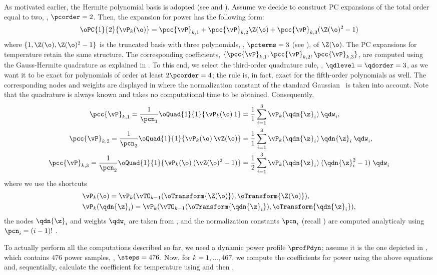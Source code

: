  As motivated earlier, the Hermite polynomial basis is adopted (see  and ). Assume we decide to construct PC expansions of the total order equal to two, \ie, $\pcorder = 2$. Then, the expansion for power has the following form:
\[
  \oPC{1}{2}{\vP_k(\o)} = \pcc{\vP}_{k, 1} + \pcc{\vP}_{k, 2} \Z(\o) + \pcc{\vP}_{k, 3} (\Z(\o)^2 - 1)
\]
where $\{ 1, \Z(\o), \Z(\o)^2 - 1 \}$ is the truncated basis with three polynomials, \ie, $\pcterms = 3$ (see ), of $\Z(\o)$. The PC expansions for temperature retain the same structure. The corresponding coefficients, $\{ \pcc{\vP}_{k, 1}, \pcc{\vP}_{k, 2}, \pcc{\vP}_{k, 3} \}$, are computed using the Gauss-Hermite quadrature as explained in . To this end, we select the third-order quadrature rule, \ie, $\qdlevel = \qdorder = 3$, as we want it to be exact for polynomials of order at least $2 \pcorder = 4$; the rule is, in fact, exact for the fifth-order polynomials as well. The corresponding nodes and weights are displayed in  where the normalization constant of the standard Gaussian \pdf\ is taken into account. Note that the quadrature is always known and takes no computational time to be obtained. Consequently,
\begin{align*}
  \pcc{\vP}_{k, 1} = \frac{1}{\pcn_1} \oQuad{1}{1}{\vP_k(\o) \: 1} & = \frac{1}{1} \sum_{i = 1}^3 \vP_k(\qdn{\z}_i) \: \qdw_i, \\
  \pcc{\vP}_{k, 2} = \frac{1}{\pcn_2} \oQuad{1}{1}{\vP_k(\o) \: \vZ(\o)} & = \frac{1}{1} \sum_{i = 1}^3 \vP_k(\qdn{\z}_i) \: \qdn{\z}_i \: \qdw_i, \\
  \pcc{\vP}_{k, 3} = \frac{1}{\pcn_2} \oQuad{1}{1}{\vP_k(\o) \: (\vZ(\o)^2 - 1)} & = \frac{1}{2} \sum_{i = 1}^3 \vP_k(\qdn{\z}_i) \; (\qdn{\z}_i^2 - 1) \; \qdw_i
\end{align*}
where we use the shortcuts
\begin{align*}
  & \vP_k(\o) = \vP_k(\vTO_{k - 1}(\oTransform{\Z(\o)}), \oTransform{\Z(\o)}), \\
  & \vP_k(\qdn{\z}_i) = \vP_k(\vTO_{k - 1}(\oTransform{\qdn{\z}_i}), \oTransform{\qdn{\z}_i}),
\end{align*}
the nodes $\qdn{\z}_i$ and weights $\qdw_i$ are taken from , and the normalization constants $\pcn_i$ (recall ) are computed analyticaly using $\pcn_i = (i - 1)!$ \cite{ghanem1991}.

To actually perform all the computations described so far, we need a dynamic power profile $\profPdyn$; assume it is the one depicted in , which contains 476 power samples, \ie, $\steps = 476$. Now, for $k = 1, \dotsc, 467$, we compute the coefficients for power using the above equations and, sequentially, calculate the coefficient for temperature using  and then .



